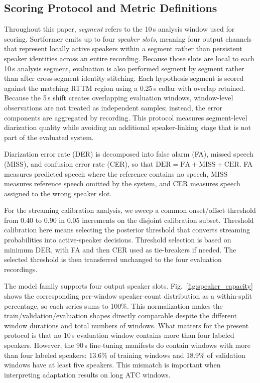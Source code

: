 \documentclass[conference]{IEEEtran}
\begin{document}
\subsection{Scoring Protocol and Metric Definitions}

Throughout this paper, \emph{segment} refers to the 10\,s analysis window used for scoring. Sortformer emits up to four \emph{speaker slots}, meaning four output channels that represent locally active speakers within a segment rather than persistent speaker identities across an entire recording. Because those slots are local to each 10\,s analysis segment, evaluation is also performed segment by segment rather than after cross-segment identity stitching. Each hypothesis segment is scored against the matching RTTM region using a 0.25\,s collar with overlap retained. Because the 5\,s shift creates overlapping evaluation windows, window-level observations are not treated as independent samples; instead, the error components are aggregated by recording. This protocol measures segment-level diarization quality while avoiding an additional speaker-linking stage that is not part of the evaluated system.

Diarization error rate (DER) is decomposed into false alarm (FA), missed speech (MISS), and confusion error rate (CER), so that $\mathrm{DER}=\mathrm{FA}+\mathrm{MISS}+\mathrm{CER}$. FA measures predicted speech where the reference contains no speech, MISS measures reference speech omitted by the system, and CER measures speech assigned to the wrong speaker slot.

For the streaming calibration analysis, we sweep a common onset/offset threshold from 0.40 to 0.90 in 0.05 increments on the disjoint calibration subset. Threshold calibration here means selecting the posterior threshold that converts streaming probabilities into active-speaker decisions. Threshold selection is based on minimum DER, with FA and then CER used as tie-breakers if needed. The selected threshold is then transferred unchanged to the four evaluation recordings.

The model family supports four output speaker slots. Fig.~\ref{fig:speaker_capacity} shows the corresponding per-window speaker-count distribution as a within-split percentage, so each series sums to 100\%. This normalization makes the train/validation/evaluation shapes directly comparable despite the different window durations and total numbers of windows. What matters for the present protocol is that no 10\,s evaluation window contains more than four labeled speakers. However, the 90\,s fine-tuning manifests do contain windows with more than four labeled speakers: 13.6\% of training windows and 18.9\% of validation windows have at least five speakers. This mismatch is important when interpreting adaptation results on long ATC windows.
\end{document}

